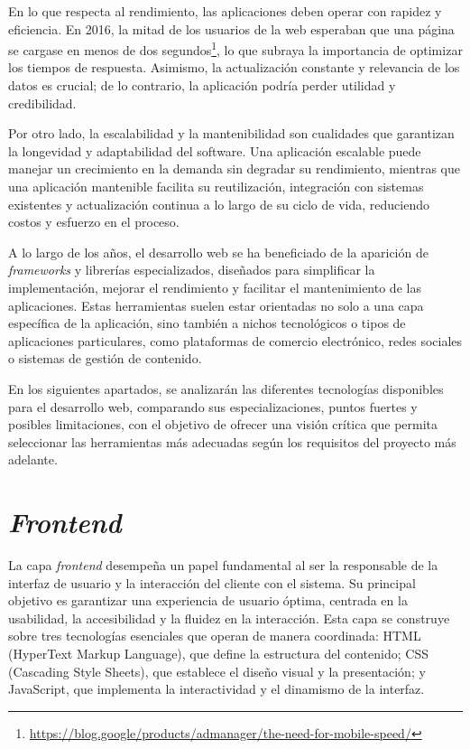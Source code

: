 En lo que respecta al rendimiento, las aplicaciones deben operar con rapidez y eficiencia. En 2016, la mitad de los usuarios de la web esperaban que una página se cargase en menos de dos segundos\footnote{\url{https://blog.google/products/admanager/the-need-for-mobile-speed/}}, lo que subraya la importancia de optimizar los tiempos de respuesta. Asimismo, la actualización constante y relevancia de los datos es crucial; de lo contrario, la aplicación podría perder utilidad y credibilidad.

Por otro lado, la escalabilidad y la mantenibilidad son cualidades que garantizan la longevidad y adaptabilidad del software. Una aplicación escalable puede manejar un crecimiento en la demanda sin degradar su rendimiento, mientras que una aplicación mantenible facilita su reutilización, integración con sistemas existentes y actualización continua a lo largo de su ciclo de vida, reduciendo costos y esfuerzo en el proceso.

A lo largo de los años, el desarrollo web se ha beneficiado de la aparición de \textit{frameworks} y librerías especializados, diseñados para simplificar la implementación, mejorar el rendimiento y facilitar el mantenimiento de las aplicaciones. Estas herramientas suelen estar orientadas no solo a una capa específica de la aplicación, sino también a nichos tecnológicos o tipos de aplicaciones particulares, como plataformas de comercio electrónico, redes sociales o sistemas de gestión de contenido.

En los siguientes apartados, se analizarán las diferentes tecnologías disponibles para el desarrollo web, comparando sus especializaciones, puntos fuertes y posibles limitaciones, con el objetivo de ofrecer una visión crítica que permita seleccionar las herramientas más adecuadas según los requisitos del proyecto más adelante.


\section{\textit{Frontend}}
La capa \textit{frontend} desempeña un papel fundamental al ser la responsable de la interfaz de usuario y la interacción del cliente con el sistema. Su principal objetivo es garantizar una experiencia de usuario óptima, centrada en la usabilidad, la accesibilidad y la fluidez en la interacción. Esta capa se construye sobre tres tecnologías esenciales que operan de manera coordinada: HTML (HyperText Markup Language), que define la estructura del contenido; CSS (Cascading Style Sheets), que establece el diseño visual y la presentación; y JavaScript, que implementa la interactividad y el dinamismo de la interfaz.

